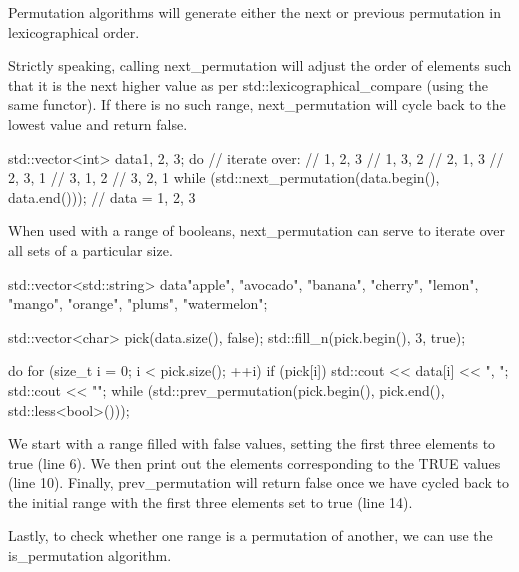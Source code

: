 Permutation algorithms will generate either the next or previous permutation in lexicographical order.



Strictly speaking, calling next\_permutation will adjust the order of elements such that it is the next higher value as per std::lexicographical\_compare (using the same functor). If there is no such range, next\_permutation will cycle back to the lowest value and return false.

\begin{box-note}
\begin{cppcode}
std::vector<int> data{1, 2, 3};
do {
    // iterate over:
    // 1, 2, 3
    // 1, 3, 2
    // 2, 1, 3
    // 2, 3, 1
    // 3, 1, 2
    // 3, 2, 1
} while (std::next_permutation(data.begin(), data.end()));
// data = {1, 2, 3}
\end{cppcode}
\end{box-note}

When used with a range of booleans, next\_permutation can serve to iterate over all sets of a particular size.

\begin{box-note}
\begin{cppcode}
std::vector<std::string> data{"apple", "avocado", "banana", 
  "cherry", "lemon", "mango", 
  "orange", "plums", "watermelon"};

std::vector<char> pick(data.size(), false);
std::fill_n(pick.begin(), 3, true);

do {
    for (size_t i = 0; i < pick.size(); ++i) {
        if (pick[i])
            std::cout << data[i] << ", ";
    }
    std::cout << "\n";
} while (std::prev_permutation(pick.begin(), pick.end(), std::less<bool>()));
\end{cppcode}
\end{box-note}

We start with a range filled with false values, setting the first three elements to true (line 6). We then print out the elements corresponding to the TRUE values (line 10). Finally, prev\_permutation will return false once we have cycled back to the initial range with the first three elements set to true (line 14).

Lastly, to check whether one range is a permutation of another, we can use the is\_permutation algorithm.

